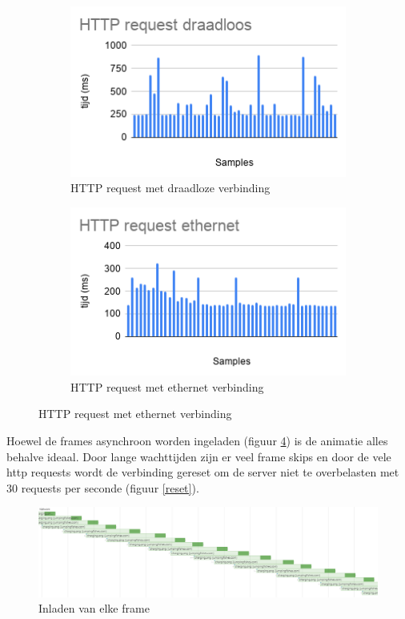 \begin{figure}[H]
	\centering
	\begin{subfigure}[b]{0.45\textwidth}
		\centering
		\includegraphics[width=\textwidth]{img/draadloos.png}
		\caption{HTTP request met draadloze verbinding} \label{draadloos}
	\end{subfigure}
	\begin{subfigure}[b]{0.45\textwidth}
		\centering
		\includegraphics[width=\textwidth]{img/ethernet.png}
		\caption{HTTP request met ethernet verbinding} \label{ethernet}
	\end{subfigure}
\end{figure}

Hoewel de frames asynchroon worden ingeladen (figuur \ref{inladen}) is de animatie alles behalve ideaal. Door lange wachttijden zijn er veel frame skips en door de vele http requests wordt de verbinding gereset om de server niet te overbelasten met 30 requests per seconde (figuur \ref{reset}).

\begin{figure}[H]
\centering
\includegraphics[scale=0.3]{img/inladen.png}
\caption{Inladen van elke frame} \label{inladen}
\end{figure}


